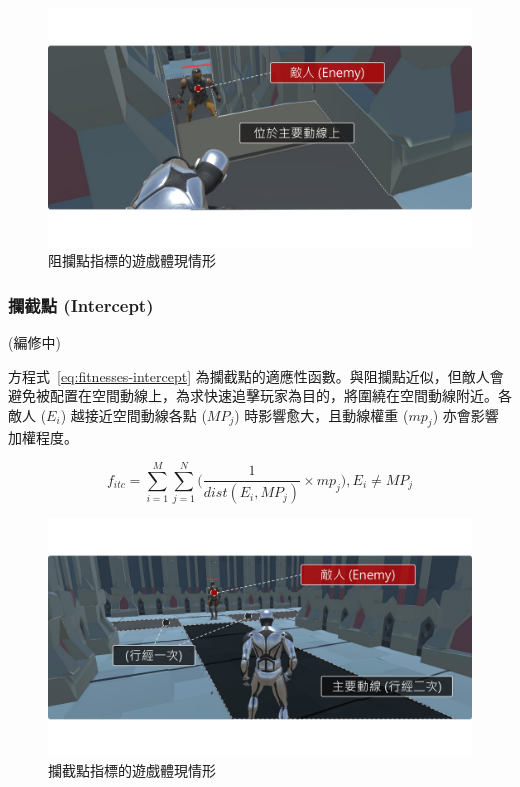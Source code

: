 \begin{figure}[ht]
  \begin{center}
    \includegraphics[width=1.0\textwidth]{figures/fitnesses-block-gameplay.pdf}
    \caption{阻攔點指標的遊戲體現情形}
    \label{fig:fitnesses-block-gameplay}
  \end{center}
\end{figure}

\subsubsection{攔截點 (Intercept)}
\label{sssec:method-segments-fitnesses-intercept}

(編修中)

方程式~\ref{eq:fitnesses-intercept} 為攔截點的適應性函數。與阻攔點近似，但敵人會避免被配置在空間動線上，為求快速追擊玩家為目的，將圍繞在空間動線附近。各敵人 ($E_{i}$) 越接近空間動線各點 ($MP_{j}$) 時影響愈大，且動線權重 ($mp_{j}$) 亦會影響加權程度。

\begin{equation}
    \label{eq:fitnesses-intercept}
    f_{itc} = \sum_{i=1}^{M} \sum_{j=1}^{N} \Big( \frac{1}{dist(E_{i}, MP_{j})} \times mp_{j} \Big), 
    E_{i} \neq MP_{j}
\end{equation}

\begin{figure}[ht]
  \begin{center}
    \includegraphics[width=1.0\textwidth]{figures/fitnesses-intercept-gameplay.pdf}
    \caption{攔截點指標的遊戲體現情形}
    \label{fig:fitnesses-intercept-gameplay}
  \end{center}
\end{figure}

